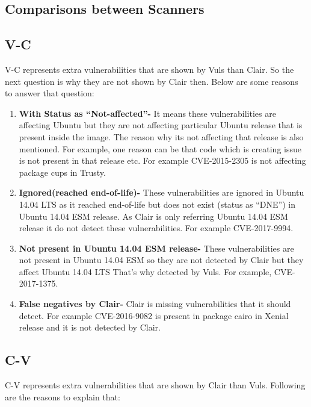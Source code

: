 \documentclass[a4paper,num-refs]{oup-contemporary}
\begin{document}
\subsection{Comparisons between Scanners}

\subsection{V-C}

V-C represents extra vulnerabilities that are shown by Vuls than Clair.
So the next question is why they are not shown by Clair then. 
Below are some reasons to answer that question:
\begin{enumerate}

\item\textbf{With Status as “Not-affected”-} It means these vulnerabilities are affecting Ubuntu but they are not 
affecting particular Ubuntu release that is present inside the image. The reason why its not affecting 
that release is also mentioned. For example, one reason can be that code which is creating issue is not 
present in that release etc. For example CVE-2015-2305 is not affecting package cups in Trusty.

\item\textbf{Ignored(reached end-of-life)-} These vulnerabilities are ignored in Ubuntu 14.04 LTS as it reached end-of-life 
but does not exist (status as “DNE”) in Ubuntu 14.04 ESM release. As Clair is only referring Ubuntu 14.04 ESM 
release it do not detect these vulnerabilities. For example CVE-2017-9994.

\item\textbf{Not present in Ubuntu 14.04 ESM release-} These vulnerabilities are not present in Ubuntu 14.04 ESM so they 
are not detected by Clair but they affect Ubuntu 14.04 LTS That’s why detected by Vuls. For example, CVE-2017-1375.

\item\textbf{False negatives by Clair-} Clair is missing vulnerabilities that it should detect. For example CVE-2016-9082 
is present in package cairo in Xenial release and it is not detected by Clair.
\end{enumerate}

\subsection{C-V}

C-V represents extra vulnerabilities that are shown by Clair than Vuls. Following are the reasons to explain that:
\end{document}
